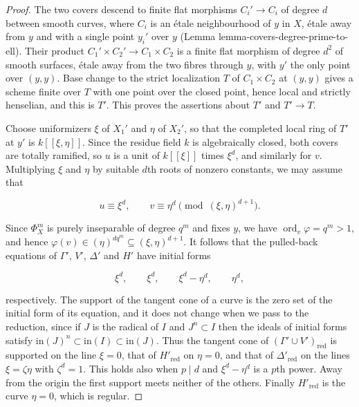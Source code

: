 \documentclass[11pt]{article}
\begin{document}
\begin{proof}[{Proof}]\label{bp266}%
The two covers descend to finite flat morphisms \(C_i'\to C_i\) of degree \(d\) between smooth curves, where \(C_i\) is an étale neighbourhood of \(y\) in \(X\), étale away from \(y\) and with a single point \(y_i'\) over \(y\) (Lemma lemma-covers-degree-prime-to-ell). Their product \(C_1'\times C_2'\to C_1\times C_2\) is a finite flat morphism of degree \(d^2\) of smooth surfaces, étale away from the two fibres through \(y\), with \(y'\) the only point over \((y,y)\). Base change to the strict localization \(T\) of \(C_1\times C_2\) at \((y,y)\) gives a scheme finite over \(T\) with one point over the closed point, hence local and strictly henselian, and this is \(T'\). This proves the assertions about \(T'\) and \(T'\to T\).

Choose uniformizers \(\xi\) of \(X_1'\) and \(\eta\) of \(X_2'\), so that the completed local ring of \(T'\) at \(y'\) is \(k[[\xi,\eta]]\). Since the residue field \(k\) is algebraically closed, both covers are totally ramified, so \(u\) is a unit of \(k[[\xi]]\) times \(\xi^d\), and similarly for \(v\). Multiplying \(\xi\) and \(\eta\) by suitable \(d\)th roots of nonzero constants, we may assume that

\[
u\equiv\xi^d,\qquad v\equiv\eta^d\pmod{(\xi,\eta)^{d+1}}.
\]

Since \(\Phi_X^m\) is purely inseparable of degree \(q^m\) and fixes \(y\), we have \(\operatorname{ord}_v\varphi=q^m>1\), and hence \(\varphi(v)\in(\eta)^{dq^m}\subseteq(\xi,\eta)^{d+1}\). It follows that the pulled-back equations of \(\Gamma'\), \(V'\), \(\Delta'\) and \(H'\) have initial forms

\[
\xi^d,\qquad\xi^d,\qquad\xi^d-\eta^d,\qquad\eta^d,
\]

respectively. The support of the tangent cone of a curve is the zero set of the initial form of its equation, and it does not change when we pass to the reduction, since if \(J\) is the radical of \(I\) and \(J^n\subset I\) then the ideals of initial forms satisfy \(\mathrm{in}(J)^n\subset\mathrm{in}(I)
\subset\mathrm{in}(J)\). Thus the tangent cone of \((\Gamma'\cup V')_{\mathrm{red}}\) is supported on the line \(\xi=0\), that of \(H'_{\mathrm{red}}\) on \(\eta=0\), and that of \(\Delta'_{\mathrm{red}}\) on the lines \(\xi=\zeta\eta\) with \(\zeta^d=1\). This holds also when \(p\mid d\) and \(\xi^d-\eta^d\) is a \(p\)th power. Away from the origin the first support meets neither of the others. Finally \(H'_{\mathrm{red}}\) is the curve \(\eta=0\), which is regular.
\end{proof}
\end{document}
